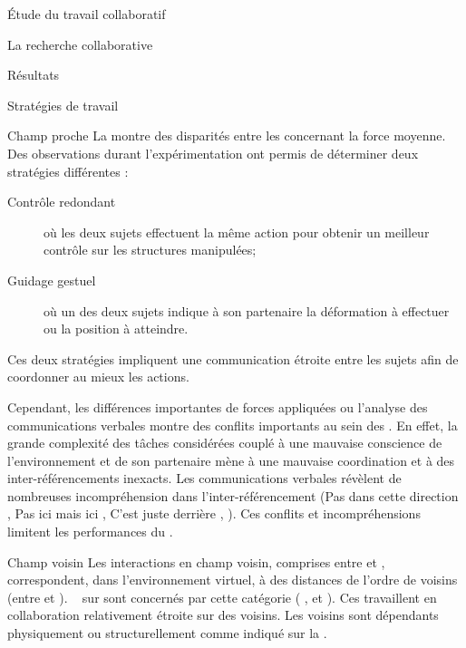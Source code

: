 \documentclass[myfrancais]{mythesis}
\begin{document}
\begin{mypart}{Étude du travail collaboratif}
\begin{mychapter}{La recherche collaborative}
\begin{mysection}{Résultats}
\begin{mysubsection}{Stratégies de travail}
\begin{mysubsubsection}{Champ proche}
						La  montre des disparités entre les  concernant la force moyenne.
						Des observations durant l'expérimentation ont permis de déterminer deux stratégies différentes :
						\begin{description}
							\item[Contrôle redondant] où les deux sujets effectuent la même action pour obtenir un meilleur contrôle sur les structures manipulées;
							\item[Guidage gestuel] où un des deux sujets indique à son partenaire la déformation à effectuer ou la position à atteindre.
						\end{description}
						Ces deux stratégies impliquent une communication étroite entre les sujets afin de coordonner au mieux les actions.

						Cependant, les différences importantes de forces appliquées  ou l'analyse des communications verbales montre des conflits importants au sein des .
						En effet, la grande complexité des tâches considérées couplé à une mauvaise conscience de l'environnement et de son partenaire mène à une mauvaise coordination et à des inter-référencements inexacts.
						Les communications verbales révèlent de nombreuses incompréhension dans l'inter-référencement (\og Pas dans cette direction \fg, \og Pas ici mais ici \fg, \og C'est juste derrière \fg, \myetc).
						Ces conflits et incompréhensions limitent les performances du .
					\end{mysubsubsection}
					\begin{mysubsubsection}{Champ voisin}
						Les interactions en champ voisin, comprises entre  et , correspondent, dans l'environnement virtuel, à des distances de l'ordre de  voisins (entre  et ).
						~ sur  sont concernés par cette catégorie ( ,  et ).
						Ces  travaillent en collaboration relativement étroite sur des  voisins.
						Les  voisins sont dépendants physiquement ou structurellement comme indiqué sur la .


\end{mysubsubsection}
\end{mysubsection}
\end{mysection}
\end{mychapter}
\end{mypart}
\end{document}
